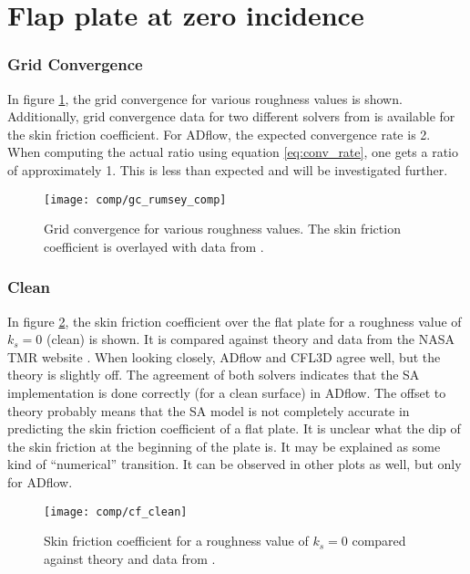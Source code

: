 \section{Flap plate at zero incidence}

\subsubsection{Grid Convergence}
In figure \ref{fig:gc_rumsey_comp}, the grid convergence for various roughness
values is shown.  Additionally, grid convergence data for two different solvers
from \cite{rumsey_flat} is available for the skin friction coefficient. For
ADflow, the expected convergence rate is 2. When computing the actual ratio using equation
\ref{eq:conv_rate}, one gets a ratio of approximately 1. This is less than
expected and will be investigated further.

\begin{figure}[H] \centering
  \texttt{[image: comp/gc\_rumsey\_comp]}
    \caption{Grid convergence for various roughness values. The skin friction
coefficient is overlayed with data from \cite{rumsey_flat}.}
    \label{fig:gc_rumsey_comp}
\end{figure}


\subsubsection{Clean}
In figure \ref{fig:cf_clean}, the skin friction coefficient over the flat plate
for a roughness value of $k_{s} = 0$ (clean) is shown. It is compared against
theory and data from the NASA TMR website \cite{rumsey_flat}. When looking
closely, ADflow and CFL3D agree well, but the theory is slightly off. The
agreement of both solvers indicates that the SA implementation is done correctly
(for a clean surface) in ADflow. The offset to theory probably means that the SA
model is not completely accurate in predicting the skin friction coefficient of
a flat plate.  It is unclear what the dip of the skin friction at the beginning
of the plate is. It may be explained as some kind of ``numerical'' transition. It
can be observed in other plots as well, but only for ADflow.

\begin{figure}[H] \centering
  \texttt{[image: comp/cf\_clean]}
    \caption{Skin friction coefficient for a roughness value of $k_{s} = 0$
      compared against theory and data from \cite{rumsey_flat}.}
    \label{fig:cf_clean}
\end{figure}

